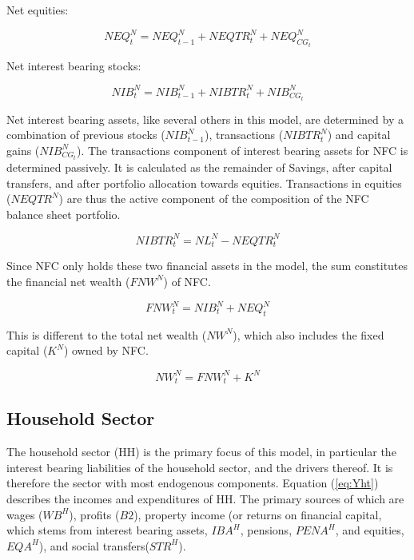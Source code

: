\documentclass[
]{book}
\begin{document}
Net equities:

\begin{equation}
NEQ^N_t = NEQ^N_{t-1} + NEQTR^N_t + NEQ^N_{CG_t}
\label{eq:nfc-neq}
\end{equation}

Net interest bearing stocks:

\begin{equation}
NIB^N_t = NIB^N_{t-1} + NIBTR^N_t + NIB^N_{CG_t}
\label{eq:nfc-nib}
\end{equation}

Net interest bearing assets, like several others in this model, are determined
by a combination of previous stocks (\(NIB^N_{t-1}\)), transactions (\(NIBTR^N_t\))
and capital gains (\(NIB^N_{CG_t}\)). The transactions component of interest
bearing assets for NFC is determined passively. It is calculated as the remainder
of Savings, after capital transfers, and after portfolio allocation towards
equities. Transactions in equities (\(NEQTR^N\)) are thus the active component of the composition
of the NFC balance sheet portfolio.

\begin{equation}
NIBTR^N_t = NL^N_t - NEQTR^N_t
\end{equation}

Since NFC only holds these two financial assets in the model, the sum constitutes the
financial net wealth (\(FNW^N\)) of NFC.

\begin{equation}
FNW^N_t = NIB^N_t + NEQ^N_t
\end{equation}

This is different to the total net wealth (\(NW^N\)), which also includes the fixed capital
(\(K^N\)) owned by NFC.

\begin{equation}
NW^N_t = FNW^N_t + K^N
\end{equation}

\hypertarget{sec:fi-fl-sfc-model-eq-hh}{%
\subsection{Household Sector}\label{sec:fi-fl-sfc-model-eq-hh}}

The household sector (HH) is the primary focus of this model, in particular the interest bearing
liabilities of the household sector, and the drivers thereof. It is therefore the sector with
most endogenous components. Equation (\ref{eq:Yht}) describes the incomes and expenditures
of HH. The primary sources of which are wages (\(WB^H\)), profits (\(B2\)), property income
(or returns on financial capital, which stems from interest bearing assets, \(IBA^H\),
pensions, \(PENA^H\), and equities, \(EQA^H\)), and social transfers(\(STR^H\)).
\end{document}
